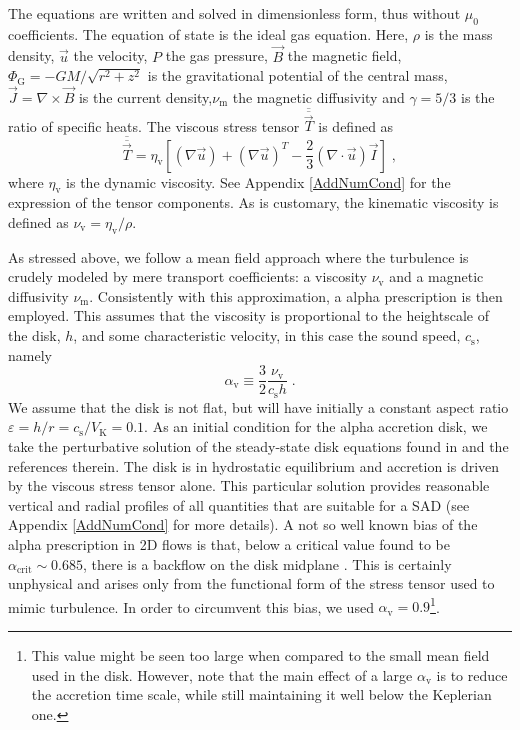 \documentclass{aa}
\begin{document}
The equations are written and solved in dimensionless form, thus without $\mu_0$ coefficients. The equation of state is the ideal gas equation. 
Here, $\rho$ is the mass density, $\vec{u}$ the velocity, $P$ the gas pressure, $\vec{B}$ the magnetic field, $\Phi_\mathrm{G} = - GM / \sqrt{r^2
+ z^2} $ is the gravitational potential of the central mass, $\vec{J}=\nabla \times \vec{B}$ is the current density,$\nu_\mathrm{m}$ the magnetic diffusivity and 
$\gamma = 5/3$ is the ratio of specific heats.  
The viscous stress tensor ${\overline {\overline {\vec T}}}$ is defined as
\begin{equation}
{\overline {\overline {\vec T}}} = \eta_\mathrm{v} \left[ \left(\nabla  \vec{u}\right) + \left(\nabla  \vec{u}\right)^T - \frac{2}{3}\left(\nabla\cdot\vec{u}\right) \vec{I} \right] \; ,
\end{equation}
where $\eta_\mathrm{v}$ is the dynamic viscosity. See Appendix \ref{AddNumCond} for the expression of the tensor components. As is customary, the kinematic viscosity 
is defined as $\nu_\mathrm{v} = \eta_\mathrm{v}/\rho$.

As stressed above, we follow a mean field approach where the turbulence is crudely modeled by mere transport coefficients: a viscosity $\nu_\mathrm{v}$ and a magnetic diffusivity $\nu_\mathrm{m}$.  
Consistently with this approximation, a \citet{1973A&A....24..337S} alpha prescription is then employed. This assumes that the viscosity is proportional to the heightscale of
the disk, $h$, and some characteristic velocity, in this case the sound speed, $c_\mathrm{s}$, namely
\begin{equation}
\alpha_\mathrm{v} \equiv \frac{3}{2}\frac{\nu_\mathrm{v}}{c_\mathrm{s} h} \; .
\end{equation}
We assume that the disk is not flat, but will have initially a constant aspect ratio $\varepsilon= h/r= c_\mathrm{s}/V_\mathrm{K}= 0.1$.
As an initial condition for the alpha accretion disk, we take the perturbative solution of the steady-state disk equations found in \citet{2009A&A...508.1117Z} and the references therein. The disk is in hydrostatic equilibrium 
and accretion is driven by the viscous stress tensor alone.  This particular solution provides reasonable vertical and radial profiles of all quantities that are suitable for a SAD (see Appendix
\ref{AddNumCond} for more details). 
A not so well known bias of the alpha prescription in 2D flows is that, below a critical value found to be $\alpha_\mathrm{crit} \sim 0.685$, there is a backflow on the
disk midplane \citep{1984SvA....28...50U}. This is certainly unphysical and arises only from the functional form of the stress tensor used to mimic turbulence. In order to circumvent this bias, we
used $\alpha_\mathrm{v}=0.9$\footnote{This value might be seen too large when compared to the small mean field used in the disk.
However, note that the main effect of a large $\alpha_\mathrm{v}$ is to reduce the accretion time scale, while still maintaining it well below the Keplerian one.}.
\end{document}
